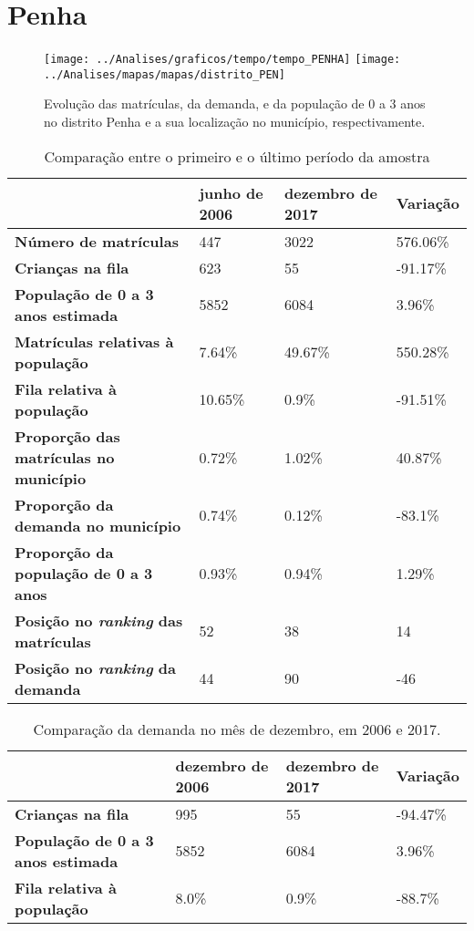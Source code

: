 \section{Penha}
\begin{figure}[H]
	\centering
	\texttt{[image: ../Analises/graficos/tempo/tempo\_PENHA]}
	\texttt{[image: ../Analises/mapas/mapas/distrito\_PEN]}
	\caption{Evolução das matrículas, da demanda, e da população de 0 a 3 anos no distrito Penha e a sua localização no município, respectivamente.}
\end{figure}
\begin{table}[H]
	\begin{tabular}{|l|l|l|l|}
		\hline
		\textbf{}                                      & \textbf{junho de 2006}       & \textbf{dezembro de 2017}    & \textbf{Variação} \\ \hline
		\textbf{Número de matrículas}                  & 447 & 3022 & 576.06\% \\ \hline
		\textbf{Crianças na fila}                      & 623 & 55 & -91.17\% \\ \hline
		\textbf{População de 0 a 3 anos estimada}      & 5852 & 6084 & 3.96\% \\ \hline
		\textbf{Matrículas relativas à população}      & 7.64\% & 49.67\% & 550.28\% \\ \hline
		\textbf{Fila relativa à população}             & 10.65\% & 0.9\% & -91.51\% \\ \hline
		\textbf{Proporção das matrículas no município} & 0.72\% & 1.02\% & 40.87\% \\ \hline
		\textbf{Proporção da demanda no município}     & 0.74\% & 0.12\% & -83.1\% \\ \hline
		\textbf{Proporção da população de 0 a 3 anos}  & 0.93\% & 0.94\% & 1.29\% \\ \hline
		\textbf{Posição no \textit{ranking} das matrículas}     & 52 & 38 & 14 \\ \hline
		\textbf{Posição no \textit{ranking} da demanda}         & 44 & 90 & -46 \\ \hline
	\end{tabular}
	\caption{Comparação entre o primeiro e o último período da amostra}
\end{table}
\begin{table}[H]
	\begin{tabular}{|l|l|l|l|}
		\hline
		\textbf{}                                 & \textbf{dezembro de 2006} & \textbf{dezembro de 2017} & \textbf{Variação} \\ \hline
		\textbf{Crianças na fila}                      & 995 & 55 & -94.47\% \\ \hline
		\textbf{População de 0 a 3 anos estimada}      & 5852 & 6084 & 3.96\% \\ \hline
		\textbf{Fila relativa à população}             & 8.0\% & 0.9\% & -88.7\% \\ \hline
	\end{tabular}
	\caption{Comparação da demanda no mês de dezembro, em 2006 e 2017.}
\end{table}
